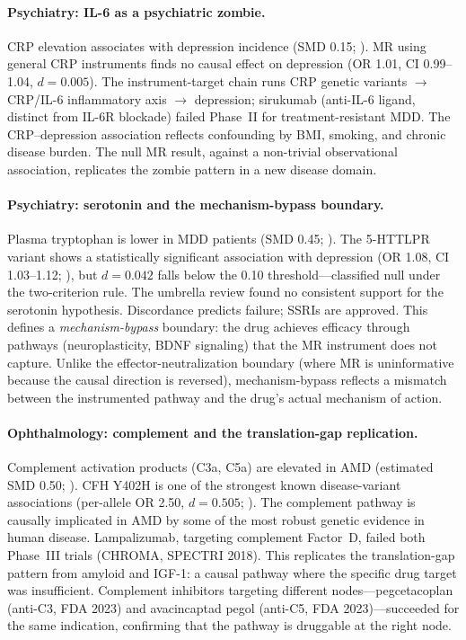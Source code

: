 \documentclass[11pt]{article}
\begin{document}
\paragraph{Psychiatry: IL-6 as a psychiatric zombie.}
CRP elevation associates with depression incidence (SMD 0.15; \cite{howren2009}). MR using general CRP instruments finds no causal effect on depression (OR 1.01, CI 0.99--1.04, $d = 0.005$). The instrument-target chain runs CRP genetic variants $\to$ CRP/IL-6 inflammatory axis $\to$ depression; sirukumab (anti-IL-6 ligand, distinct from IL-6R blockade) failed Phase~II for treatment-resistant MDD. The CRP--depression association reflects confounding by BMI, smoking, and chronic disease burden. The null MR result, against a non-trivial observational association, replicates the zombie pattern in a new disease domain.

\paragraph{Psychiatry: serotonin and the mechanism-bypass boundary.}
Plasma tryptophan is lower in MDD patients (SMD 0.45; \cite{ogawa2014}). The 5-HTTLPR variant shows a statistically significant association with depression (OR 1.08, CI 1.03--1.12; \cite{clarke2010serotonin}), but $d = 0.042$ falls below the 0.10 threshold---classified null under the two-criterion rule. The \citet{moncrieff2022} umbrella review found no consistent support for the serotonin hypothesis. Discordance predicts failure; SSRIs are approved. This defines a \emph{mechanism-bypass} boundary: the drug achieves efficacy through pathways (neuroplasticity, BDNF signaling) that the MR instrument does not capture. Unlike the effector-neutralization boundary (where MR is uninformative because the causal direction is reversed), mechanism-bypass reflects a mismatch between the instrumented pathway and the drug's actual mechanism of action.

\paragraph{Ophthalmology: complement and the translation-gap replication.}
Complement activation products (C3a, C5a) are elevated in AMD (estimated SMD 0.50; \cite{reynolds2009}). CFH Y402H is one of the strongest known disease-variant associations (per-allele OR 2.50, $d = 0.505$; \cite{thakkinstian2006}). The complement pathway is causally implicated in AMD by some of the most robust genetic evidence in human disease. Lampalizumab, targeting complement Factor~D, failed both Phase~III trials (CHROMA, SPECTRI 2018). This replicates the translation-gap pattern from amyloid and IGF-1: a causal pathway where the specific drug target was insufficient. Complement inhibitors targeting different nodes---pegcetacoplan (anti-C3, FDA 2023) and avacincaptad pegol (anti-C5, FDA 2023)---succeeded for the same indication, confirming that the pathway is druggable at the right node.
\end{document}
